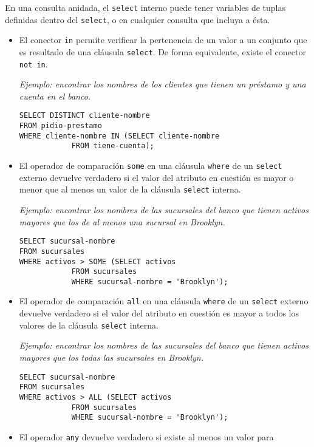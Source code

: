 \documentclass[a4paper, twoside]{article}
\begin{document}
En una consulta anidada, el \texttt{select} interno puede tener variables
de tuplas definidas dentro del \texttt{select}, o en cualquier consulta
que incluya a ésta.
\begin{itemize}
\item El conector \texttt{in} permite verificar la pertenencia de un valor
a un conjunto que es resultado de una cláusula \texttt{select}. De
forma equivalente, existe el conector \texttt{not in}.


\emph{Ejemplo: encontrar los nombres de los clientes que tienen un
préstamo y una cuenta en el banco.}


\begin{lstlisting}
SELECT DISTINCT cliente-nombre
FROM pidio-prestamo
WHERE cliente-nombre IN (SELECT cliente-nombre
			FROM tiene-cuenta);
\end{lstlisting}


\item El operador de comparación \texttt{some} en una cláusula \texttt{where}
de un \texttt{select} externo devuelve verdadero si el valor del atributo
en cuestión es mayor o menor que al menos un valor de la cláusula
\texttt{select} interna.


\emph{Ejemplo: encontrar los nombres de las sucursales del banco que
tienen activos mayores que los de al menos una sucursal en Brooklyn.}


\begin{lstlisting}
SELECT sucursal-nombre
FROM sucursales
WHERE activos > SOME (SELECT activos
			FROM sucursales
			WHERE sucursal-nombre = 'Brooklyn');
\end{lstlisting}


\item El operador de comparación \texttt{all} en una cláusula \texttt{where}
de un \texttt{select} externo devuelve verdadero si el valor del atributo
en cuestión es mayor a todos los valores de la cláusula \texttt{select}
interna.


\emph{Ejemplo: encontrar los nombres de las sucursales del banco que
tienen activos mayores que los todas las sucursales en Brooklyn.}


\begin{lstlisting}
SELECT sucursal-nombre
FROM sucursales
WHERE activos > ALL (SELECT activos
			FROM sucursales
			WHERE sucursal-nombre = 'Brooklyn');
\end{lstlisting}


\item El operador \texttt{any} devuelve verdadero si existe al menos un
valor para



\end{itemize}
\end{document}
